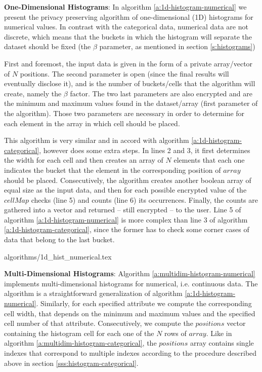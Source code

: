 \textbf{One-Dimensional Histograms}: In algorithm \ref{a:1d-histogram-numerical} we present the privacy preserving algorithm of one-dimensional (1D) histograms for numerical values.
In contrast with the categorical data, numerical data are not discrete, which means that the buckets in which the histogram will separate the dataset should be fixed (the $\beta$ parameter, as mentioned in section \ref{s:histograms})

First and foremost, the input data is given in the form of a private array/vector of $N$ positions.
The second parameter is open (since the final results will eventually disclose it), and is the number of buckets/cells that the algorithm will create, namely the $\beta$ factor.
The two last parameters are also encrypted and are the minimum and maximum values found in the dataset/array (first parameter of the algorithm).
Those two parameters are necessary in order to determine for each element in the array in which cell should be placed.

This algorithm is very similar and in accord with algorithm \ref{a:1d-histogram-categorical}, however does some extra steps.
In lines 2 and 3, it first determines the width for each cell and then creates an array of $N$ elements that each one indicates the bucket that the element in the corresponding position of $array$ should be placed.
Consecutively, the algorithm creates another boolean array of equal size as the input data, and then for each possible encrypted value of the $cellMap$ checks (line 5) and counts (line 6) its occurrences.
Finally, the counts are gathered into a vector and returned -- still encrypted -- to the user.
Line 5 of algorithm \ref{a:1d-histogram-numerical} is more complex than line 3 of algorithm \ref{a:1d-histogram-categorical}, since the former has to check some corner cases of data that belong to the last bucket.

{algorithms/1d_hist_numerical.tex}



\textbf{Multi-Dimensional Histograms}:
Algorithm \ref{a:multidim-histogram-numerical} implements multi\hyp dimensional histograms for numerical, i.e. continuous data.
The algorithm is a straightforward generalization of algorithm \ref{a:1d-histogram-numerical}.
Similarly, for each specified attribute we compute the corresponding cell width, that depends on the minimum and maximum values and the specified cell number of that attribute.
Consecutively, we compute the $positions$ vector containing the histogram cell for each one of the $N$ rows of $array$.
Like in algorithm \ref{a:multidim-histogram-categorical}, the $positions$ array contains single indexes that correspond to multiple indexes according to the procedure described above in section \ref{sss:histogram-categorical}.


